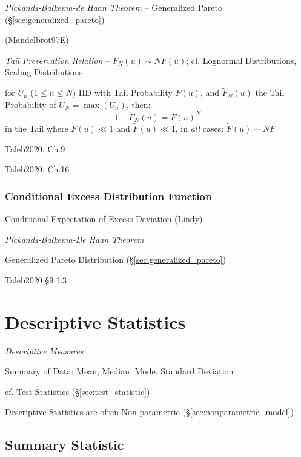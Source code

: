 \emph{Pickands-Balkema-de Haan Theorem} -- Generalized Pareto
(\S\ref{sec:generalized_pareto})

(Mandelbrot97E)

\emph{Tail Preservation Relation} -- $\overline{F}_N(u) \sim N \overline{F}(u)$;
cf. Lognormal Distributions, Scaling Distributions

for $U_n$ ($1 \leq n \leq N$) IID with Tail Probability $\overline{F}(u)$, and
$\tilde{F}_N(u)$ the Tail Probability of $\tilde{U}_N = \max(U_n)$, then:
\[
  1 - \tilde{F}_N(u) = F(u)^N
\]
in the Tail where $\overline{F}(u) \ll 1$ and $\tilde{F}(u) \ll 1$, in
\emph{all} cases: $\tilde{F}(u) \sim N \overline{F}$

Taleb2020, Ch.9

Taleb2020, Ch.16



\subsubsection{Conditional Excess Distribution Function}
\label{sec:conditional_excess_distribution}

Conditional Expectation of Excess Deviation (Lindy)

\emph{Pickands-Balkema-De Haan Theorem}

Generalized Pareto Distribution (\S\ref{sec:generalized_pareto})

Taleb2020 \S 9.1.3



\section{Descriptive Statistics}\label{sec:descriptive_statistics}

\emph{Descriptive Measures}

Summary of Data: Mean, Median, Mode, Standard Deviation

cf. Test Statistics (\S\ref{sec:test_statistic})

Descriptive Statistics are often Non-parametric
(\S\ref{sec:nonparametric_model})



\subsection{Summary Statistic}\label{sec:summary_statistic}

